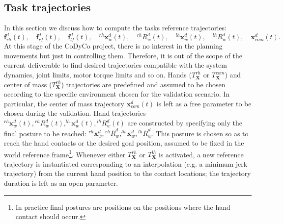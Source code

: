 \documentclass[12pt,a4paper,twoside]{article}
\begin{document}
\subsection{Task trajectories} \label{sec:refTrajectories}

In this section we discuss how to compute the tasks reference trajectories:
$$
{\bm f}^d_{rh} (t), \quad {\bm f}^d_{rf}(t),  \quad {\bm f}^d_{lf}(t), \quad ^{rh}{ {\bm x}}^d_w(t), \quad {}^{rh}{ {R}}_w^d(t) , \quad ^{lh}{ {\bm x}}^d_w(t), \quad {}^{lh}{ {R}}_w^d(t), \quad {\bm x}^d_{com}(t).
$$
At this stage of the CoDyCo project, there is no interest in the planning movements but just in controlling them. Therefore, it is out of the scope of the current deliverable to find desired trajectories compatible with the system dynamics, joint limits, motor torque limits and so on. Hands ($T^{rh}_{\bm X}$ or $T^{com}_{\bm X}$) and center of mass ($T^{rh}_{\bm X}$) trajectories are predefined and assumed to be chosen according to the specific environment chosen for the validation scenario. In particular, the center of mass trajectory ${\bm x}^d_{com}(t)$ is left as a free parameter to be chosen during the validation. Hand trajectories $^{rh}{ {\bm x}}^d_w(t), {}^{rh}{ {R}}_w^d(t), ^{lh}{ {\bm x}}^d_w(t), {}^{lh}{ {R}}_w^d(t)$ are constructed by specifying only the final posture to be reached: $^{rh}{ {\bar{\bm x}}}^d_w, {}^{rh}{ {\bar R}}_w^d, ^{lh}{ \bar{\bm x}}^d_w, {}^{lh}{ \bar {R}}_w^d$. This posture is chosen so as to reach the hand contacts or the desired goal position, assumed to be fixed in the world reference frame\footnote{In practice final postures are positions on the positions where the hand contact should occur.}. Whenever either $T^{rh}_{\bm X}$ or $T^{lh}_{\bm X}$ is activated, a new reference trajectory is instantiated corresponding to an interpolation (e.g. a minimum jerk trajectory) from the current hand position to the contact locations; the trajectory duration is left as an open parameter. 
\end{document}
